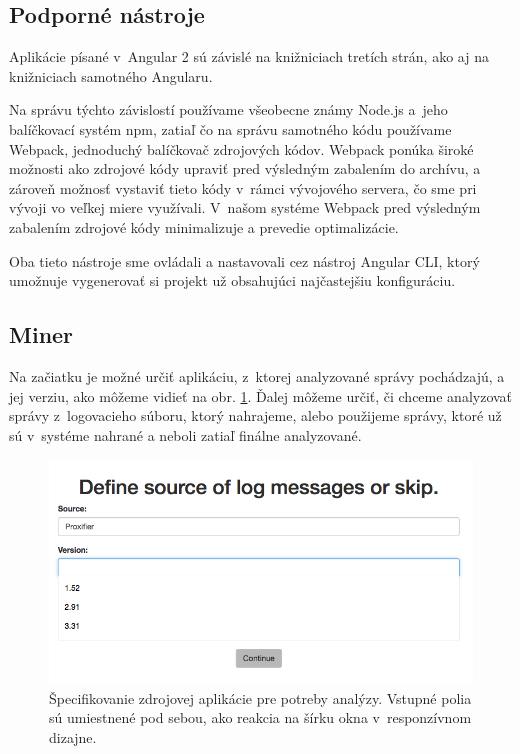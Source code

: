 \subsection{Podporné nástroje}
Aplikácie písané v~Angular 2 sú závislé na knižniciach tretích strán, ako aj na knižniciach samotného Angularu.
\par Na správu týchto závislostí používame všeobecne známy Node.js a~jeho balíčkovací systém npm, zatiaľ čo na správu samotného kódu používame Webpack, jednoduchý balíčkovač zdrojových kódov. Webpack ponúka široké možnosti ako zdrojové kódy upraviť pred výsledným zabalením do archívu, a zároveň možnosť vystaviť tieto kódy v~rámci vývojového servera, čo sme pri vývoji vo veľkej miere využívali. V~našom systéme Webpack pred výsledným zabalením zdrojové kódy minimalizuje a prevedie optimalizácie.
\par Oba tieto nástroje sme ovládali a nastavovali cez nástroj Angular CLI, ktorý umožnuje vygenerovať si projekt už obsahujúci najčastejšiu konfiguráciu.


\subsection{Miner}
Na začiatku je možné určiť aplikáciu, z~ktorej analyzované správy pochádzajú, a jej verziu, ako môžeme vidieť na obr. \ref{fig:miner-source}. Ďalej môžeme určiť, či chceme analyzovať správy z~logovacieho súboru, ktorý nahrajeme, alebo použijeme správy, ktoré už sú v~systéme nahrané a neboli zatiaľ finálne analyzované.

\begin{figure}[htbp]
 \centering 
 \begin{minipage}{0.95\linewidth}
 	\centering
 	\includegraphics[width=\textwidth]{Images/thesis-miner-source.png}
 \end{minipage}
  \caption{Špecifikovanie zdrojovej aplikácie pre potreby analýzy. \mbox{Vstupné} polia sú umiestnené pod sebou, ako reakcia na šírku okna v~responzívnom dizajne.}
  \label{fig:miner-source}
\end{figure}

